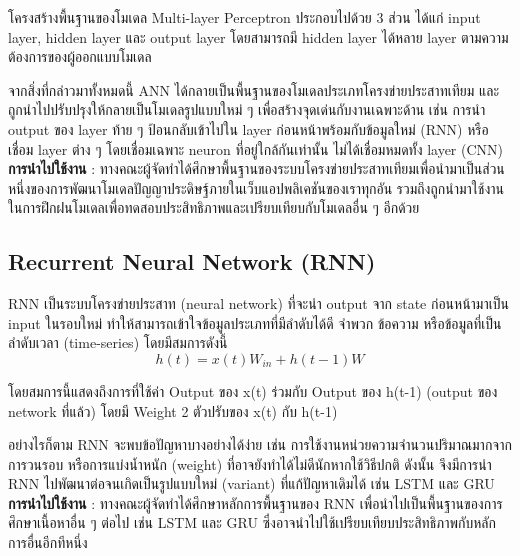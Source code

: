 โครงสร้างพื้นฐานของโมเดล Multi-layer Perceptron ประกอบไปด้วย 3 ส่วน ได้แก่ input layer, hidden layer และ output layer โดยสามารถมี hidden layer ได้หลาย layer ตามความต้องการของผู้ออกแบบโมเดล

จากสิ่งที่กล่าวมาทั้งหมดนี้ ANN ได้กลายเป็นพื้นฐานของโมเดลประเภทโครงข่ายประสาทเทียม และถูกนำไปปรับปรุงให้กลายเป็นโมเดลรูปแบบใหม่ ๆ เพื่อสร้างจุดเด่นกับงานเฉพาะด้าน เช่น การนำ output ของ layer ท้าย ๆ ป้อนกลับเข้าไปใน layer ก่อนหน้าพร้อมกับข้อมูลใหม่ (RNN) หรือ เชื่อม layer ต่าง ๆ โดยเชื่อมเฉพาะ neuron ที่อยู่ใกล้กันเท่านั้น ไม่ได้เชื่อมหมดทั้ง layer (CNN)
\textbf{การนำไปใช้งาน} : ทางคณะผู้จัดทำได้ศึกษาพื้นฐานของระบบโครงข่ายประสาทเทียมเพื่อนำมาเป็นส่วนหนึ่งของการพัฒนาโมเดลปัญญาประดิษฐ์ภายในเว็บแอปพลิเคชันของเราทุกอัน รวมถึงถูกนำมาใช้งานในการฝึกฝนโมเดลเพื่อทดสอบประสิทธิภาพและเปรียบเทียบกับโมเดลอื่น ๆ อีกด้วย


\subsection{Recurrent Neural Network (RNN)}
RNN เป็นระบบโครงข่ายประสาท (neural network) ที่จะนำ output จาก state
ก่อนหน้ามาเป็น input ในรอบใหม่ ทำให้สามารถเข้าใจข้อมูลประเภทที่มีลำดับได้ดี จำพวก
ข้อความ หรือข้อมูลที่เป็นลำดับเวลา (time-series) โดยมีสมการดังนี้
\[h(t) = x(t) W_{in} + h(t-1)W\]
\par โดยสมการนี้แสดงถึงการที่ใช้ค่า Output ของ x(t) ร่วมกับ Output ของ h(t-1)
(output ของ network ที่แล้ว) โดยมี Weight 2 ตัวปรับของ x(t) กับ h(t-1)
\par อย่างไรก็ตาม RNN จะพบข้อปัญหาบางอย่างได้ง่าย เช่น
การใช้งานหน่วยความจำนวนปริมาณมากจากการวนรอบ หรือการแบ่งน้ำหนัก (weight)
ที่อาจยังทำได้ไม่ดีนักหากใช้วิธีปกติ ดังนั้น จึงมีการนำ RNN
ไปพัฒนาต่อจนเกิดเป็นรูปแบบใหม่ (variant) ที่แก้ปัญหาเดิมได้ เช่น LSTM และ GRU \\
\textbf{การนำไปใช้งาน} : ทางคณะผู้จัดทำได้ศึกษาหลักการพื้นฐานของ RNN
เพื่อนำไปเป็นพื้นฐานของการศึกษาเนื้อหาอื่น ๆ ต่อไป เช่น LSTM และ GRU
ซึ่งอาจนำไปใช้เปรียบเทียบประสิทธิภาพกับหลักการอื่นอีกทีหนึ่ง
